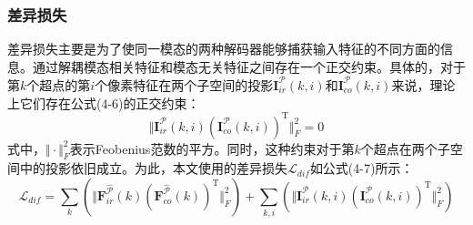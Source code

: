     \subsubsection{差异损失}
    差异损失主要是为了使同一模态的两种解码器能够捕获输入特征的不同方面的信息。通过解耦模态相关特征和模态无关特征之间存在一个正交约束。具体的，对于第$k$个超点的第$i$个像素特征在两个子空间的投影$\mathbf{I}^{\mathcal{P}}_{ir}(k,i)$和$\mathbf{I}^{\mathcal{P}}_{co}(k,i)$来说，理论上它们存在公式(4-6)的正交约束：
    \begin{equation}
        \Vert \mathbf{I}^{\mathcal{P}}_{ir}(k,i) (\mathbf{I}^{\mathcal{P}}_{co}(k,i))^\mathrm{T} \Vert^2_F = 0
    \end{equation}
    式中，$\Vert \cdot \Vert^2_F$表示Feobenius范数的平方。同时，这种约束对于第$k$个超点在两个子空间中的投影依旧成立。为此，本文使用的差异损失$\mathcal{L}_{dif}$如公式(4-7)所示：
    \begin{equation}
        \mathcal{L}_{dif} = 
        \sum_k (\Vert \mathbf{F}^{\hat{\mathcal{P}}}_{ir}(k) (\mathbf{F}^{\hat{\mathcal{P}}}_{co}(k))^\mathrm{T} \Vert^2_F) + 
        \sum_{k,i} (\Vert \mathbf{I}^{\mathcal{P}}_{ir}(k,i) (\mathbf{I}^{\mathcal{P}}_{co}(k,i))^\mathrm{T} \Vert^2_F)
    \end{equation}


